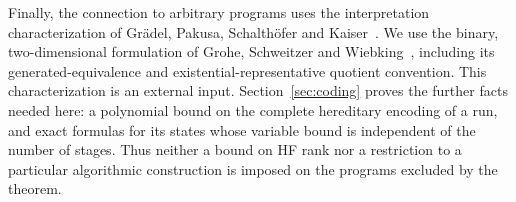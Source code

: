 Finally, the connection to arbitrary programs uses the interpretation
characterization of Gr{\"a}del, Pakusa, Schalth{\"o}fer and
Kaiser~\cite[Theorem~1]{gkps2015}. We use the binary, two-dimensional
formulation of Grohe, Schweitzer and Wiebking~\cite[Section~6, Theorem~18,
arXiv version~1]{gsw2020}, including its generated-equivalence and
existential-representative quotient convention. This characterization is
an external input. Section~\ref{sec:coding} proves the further facts
needed here: a polynomial bound on the complete hereditary encoding of a
run, and exact formulas for its states whose variable bound is independent
of the number of stages. Thus neither a bound on HF rank nor a restriction
to a particular algorithmic construction is imposed on the programs
excluded by the theorem.
